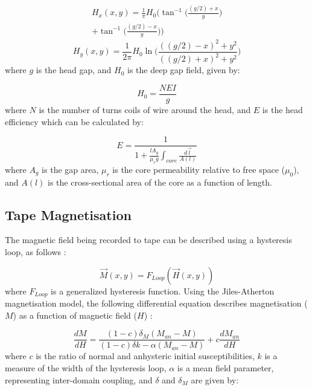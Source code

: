 \documentclass[twoside,a4paper]{article}
\begin{document}
\begin{multline}
    H_x(x,y) = \frac{1}{\pi} H_0 \Big(\tan^{-1} \Big(\frac{(g/2) + x}{y} \Big) \\
    + \tan^{-1} \Big(\frac{(g/2) - x}{y} \Big) \Big)
    \label{eq1}
\end{multline}
\begin{equation}
    H_y(x,y) = \frac{1}{2 \pi} H_0 \ln \Big(\frac{((g/2) - x)^2 + y^2}{((g/2) + x)^2 + y^2} \Big)
    \label{eq2}
\end{equation}
%
where $g$ is the head gap, and $H_0$ is the deep gap field, given by:

\begin{equation}
    H_0 = \frac{NEI}{g}
\end{equation}
%
where $N$ is the number of turns coils of wire around the head, and $E$ is the head 
efficiency which can be calculated by:

\begin{equation}
    E = \frac{1}{1 + \frac{l  A_g}{\mu_r g} \int_{core} \frac {d \vec{l}}{A(l)}}
\end{equation}
%
where $A_g$ is the gap area, $\mu_r$ is the core permeability relative to 
free space ($\mu_0$), and $A(l)$ is the cross-sectional 
area of the core as a function of length.

\subsection{Tape Magnetisation}
The magnetic field being recorded to tape can be described using 
a hysteresis loop, as follows \cite{1994tmr..book.....B}:

\begin{equation}
    \vec{M}(x,y) = F_{Loop}(\vec{H}(x,y))
\end{equation}
%
where $F_{Loop}$ is a generalized hysteresis function.
\newline\newline
Using the Jiles-Atherton magnetisation model, the following
differential equation describes magnetisation ($M$) as a function 
of magnetic field ($H$) \cite{Hysteresis}:

\begin{equation}
    \frac{dM}{dH} = \frac{(1-c) \delta_M (M_{an} - M)}{(1-c) \delta k - \alpha (M_{an} - M)} + c \frac{dM_{an}}{dH}
    \label{eq5}
\end{equation}
%
where $c$ is the ratio of normal and anhysteric initial susceptibilities,
$k$ is a measure of the width of the hysteresis
loop, $\alpha$ is a mean field parameter, representing inter-domain
coupling, and $\delta$ and $\delta_M$ are given by:
\end{document}
